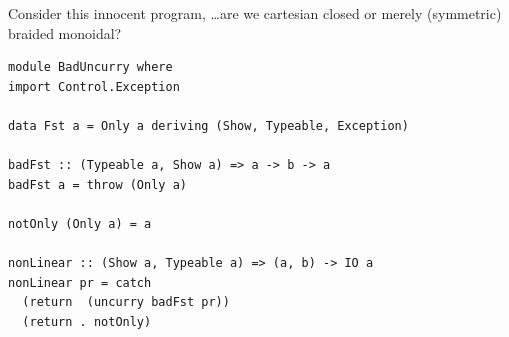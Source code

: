 \documentclass[11pt,reqno]{beamer}
\begin{document}

\begin{frame}[fragile]
Consider this innocent program, \ldots are we cartesian closed or merely (symmetric) braided monoidal?
\begin{verbatim}
module BadUncurry where
import Control.Exception

data Fst a = Only a deriving (Show, Typeable, Exception)

badFst :: (Typeable a, Show a) => a -> b -> a
badFst a = throw (Only a)

notOnly (Only a) = a

nonLinear :: (Show a, Typeable a) => (a, b) -> IO a
nonLinear pr = catch
  (return  (uncurry badFst pr))
  (return . notOnly)
\end{verbatim}
\end{frame}






\end{document}
